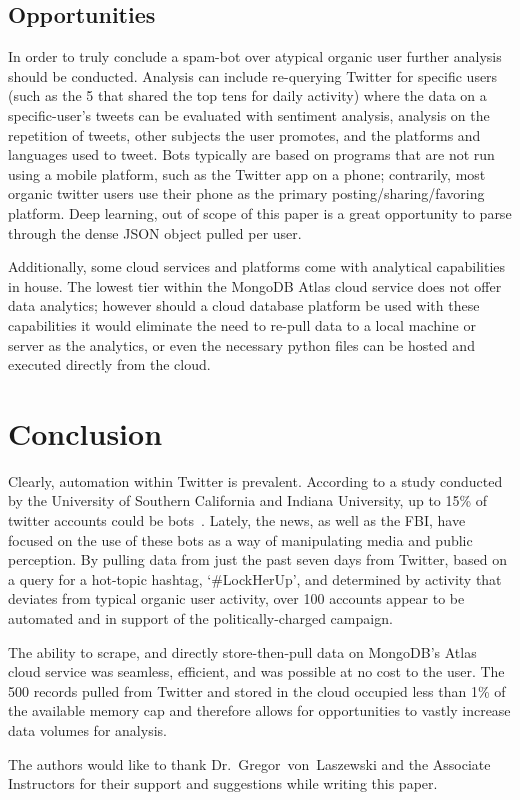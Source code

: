 \subsection{Opportunities}

In order to truly conclude a spam-bot over atypical organic user further
analysis should be conducted. Analysis can include re-querying Twitter for
specific users (such as the 5 that shared the top tens for daily activity)
where the data on a specific-user's tweets can be evaluated with sentiment
analysis, analysis on the repetition of tweets, other subjects the user
promotes, and the platforms and languages used to tweet. Bots typically are
based on programs that are not run using a mobile platform, such as the Twitter
app on a phone; contrarily, most organic twitter users use their phone as the
primary posting/sharing/favoring platform. Deep learning, out of scope of this
paper is a great opportunity to parse through the dense JSON object pulled per
user.

Additionally, some cloud services and platforms come with analytical
capabilities in house. The lowest tier within the MongoDB Atlas cloud service
does not offer data analytics; however should a cloud database platform be used
with these capabilities it would eliminate the need to re-pull data to a local
machine or server as the analytics, or even the necessary python files can be
hosted and executed directly from the cloud.

\section{Conclusion}

Clearly, automation within Twitter is prevalent. According to a study conducted
by the University of Southern California and Indiana University, up to 15\% of
twitter accounts could be bots~\cite{USCIUBotStudy}. Lately, the news, as well
as the FBI, have focused on the use of these bots as a way of manipulating
media and public perception. By pulling data from just the past seven days from
Twitter, based on a query for a hot-topic hashtag, `\#LockHerUp', and
determined by activity that deviates from typical organic user activity, over
100 accounts appear to be automated and in support of the politically-charged
campaign.

The ability to scrape, and directly store-then-pull data on MongoDB's Atlas
cloud service was seamless, efficient, and was possible at no cost to the user.
The 500 records pulled from Twitter and stored in the cloud occupied less than
1\% of the available memory cap and therefore allows for opportunities to
vastly increase data volumes for analysis. 

\begin{acks}

  The authors would like to thank Dr.~Gregor~von~Laszewski and the Associate
Instructors for their support and suggestions while writing this paper.

\end{acks}


 
